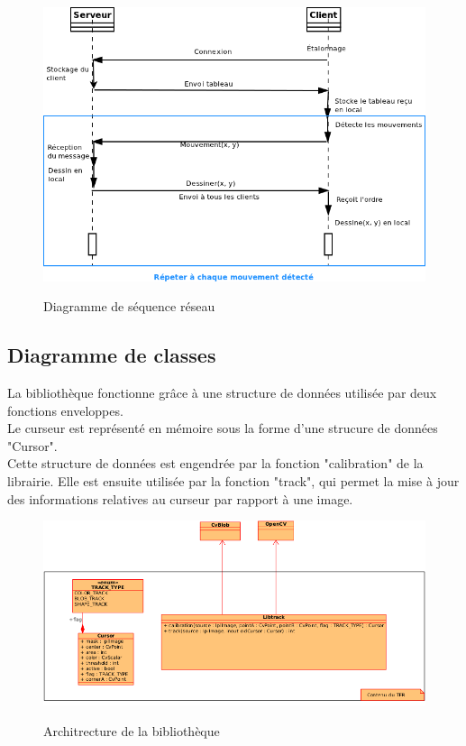 \documentclass{report}
\begin{document}
				\newpage
				\begin{figure}[!h]
						\centering
						\includegraphics[scale=0.6]{../soutenance/sequence_reseau.png}\\
						\caption{Diagramme de séquence réseau}
						\label{Diagramme de séquence réseau}
				\end{figure}

			\newpage
			\subsection{Diagramme de classes}
				La bibliothèque fonctionne grâce à une structure de données utilisée par deux fonctions enveloppes. \\
				Le curseur est représenté en mémoire sous la forme d'une strucure de données "Cursor". \\
				Cette structure de données est engendrée par la fonction "calibration" de la librairie. Elle est ensuite utilisée par la fonction "track", qui permet la mise à jour des informations relatives au curseur par rapport à une image. \\
				\begin{figure}[!h]
						\centering
						\includegraphics[scale=0.8]{../soutenance/libtrack-uml.png}\\
						\caption{Architrecture de la bibliothèque}
						\label{Architrecture de la bibliothèque}
				\end{figure}
\end{document}
